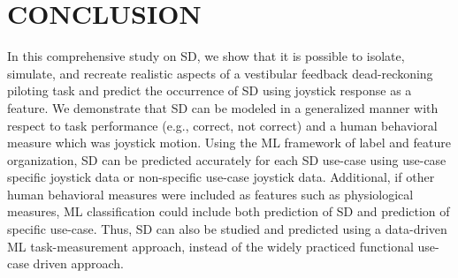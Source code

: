 \documentclass{ieeeaccess}
\begin{document}
\section{CONCLUSION}
In this comprehensive study on SD, we show that it is possible to isolate, simulate, and recreate realistic aspects of a vestibular feedback dead-reckoning piloting task and predict the occurrence of SD using joystick response as a feature. We demonstrate that SD can be modeled in a generalized manner with respect to task performance (e.g., correct, not correct) and a human behavioral measure which was joystick motion. Using the ML framework of label and feature organization, SD can be predicted accurately for each SD use-case using use-case specific joystick data or non-specific use-case joystick data. Additional, if other human behavioral measures were included as features such as physiological measures, ML classification could include both prediction of SD and prediction of specific use-case. Thus, SD can also be studied and predicted using a data-driven ML task-measurement approach, instead of the widely practiced functional use-case driven approach.
\end{document}
